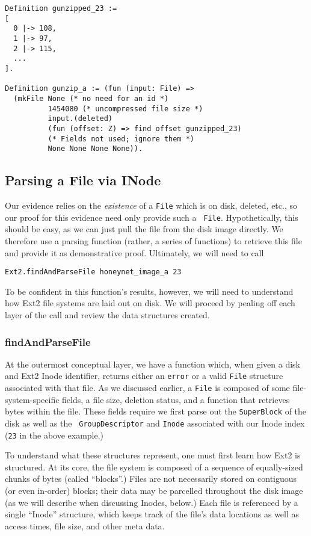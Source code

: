 \documentclass[nocopyrightspace]{sigplanconf}
\begin{document}
\begin{lstlisting}
Definition gunzipped_23 := 
[ 
  0 |-> 108, 
  1 |-> 97, 
  2 |-> 115, 
  ...
].

Definition gunzip_a := (fun (input: File) => 
  (mkFile None (* no need for an id *)
          1454080 (* uncompressed file size *)
          input.(deleted) 
          (fun (offset: Z) => find offset gunzipped_23)
          (* Fields not used; ignore them *)
          None None None None)).
\end{lstlisting}

\subsection{Parsing a File via INode}

Our evidence relies on the {\it existence} of a {\tt File} which is on disk,
deleted, etc., so our proof for this evidence need only provide such a {\tt
File}. Hypothetically, this should be easy, as we can just pull the file from
the disk image directly. We therefore use a parsing function (rather, a series
of functions) to retrieve this file and provide it as demonstrative proof.
Ultimately, we will need to call

\begin{lstlisting}
Ext2.findAndParseFile honeynet_image_a 23
\end{lstlisting}

To be confident in this function's results, however, we will need to
understand how Ext2 file systems are laid out on disk. We will proceed by
pealing off each layer of the call and review the data structures created.

\subsubsection{findAndParseFile}

At the outermost conceptual layer, we have a function which, when given a disk
and Ext2 Inode identifier, returns either an {\tt error} or a valid {\tt File}
structure associated with that file. As we discussed earlier, a {\tt File} is
composed of some file-system-specific fields, a file size, deletion status,
and a function that retrieves bytes within the file. These fields require we
first parse out the {\tt SuperBlock} of the disk as well as the {\tt
GroupDescriptor} and {\tt Inode} associated with our Inode index ({\tt 23} in
the above example.)

To understand what these structures represent, one must first learn how Ext2
is structured. At its core, the file system is composed of a sequence of
equally-sized chunks of bytes (called ``blocks''.) Files are not necessarily
stored on contiguous (or even in-order) blocks; their data may be parcelled
throughout the disk image (as we will describe when discussing Inodes, below.)
Each file is referenced by a single ``Inode'' structure, which keeps track of
the file's data locations as well as access times, file size, and other meta
data. 
\end{document}
